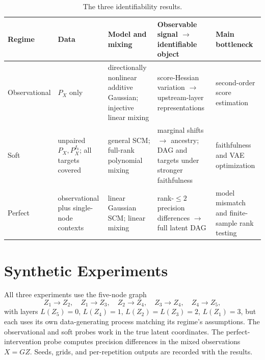 \documentclass{article}
\begin{document}
\begin{table}[t]
\centering
\caption{The three identifiability results.}
\label{tab:comparison}
\begingroup
\footnotesize
\setlength{\tabcolsep}{3pt}
\renewcommand{\arraystretch}{1.18}
\begin{tabularx}{\textwidth}{@{}l >{\raggedright\arraybackslash}p{} >{\raggedright\arraybackslash}p{} >{\raggedright\arraybackslash}X >{\raggedright\arraybackslash}p{}@{}}
\toprule
\textbf{Regime} & \textbf{Data} & \textbf{Model and mixing} & \textbf{Observable signal $\boldsymbol{\rightarrow}$ identifiable object} & \textbf{Main bottleneck} \\
\midrule
Observational & $P_X$ only & directionally nonlinear additive Gaussian; injective linear mixing & score-Hessian variation $\rightarrow$ upstream-layer representations & second-order score estimation \\
\addlinespace[0.15em]
Soft & unpaired $P_X,P_X^{I_k}$; all targets covered & general SCM; full-rank polynomial mixing & marginal shifts $\rightarrow$ ancestry; DAG and targets under stronger faithfulness & faithfulness and VAE optimization \\
\addlinespace[0.15em]
Perfect & observational plus single-node contexts & linear Gaussian SCM; linear mixing & rank-$\leq2$ precision differences $\rightarrow$ full latent DAG & model mismatch and finite-sample rank testing \\
\bottomrule
\end{tabularx}
\endgroup
\end{table}

\section{Synthetic Experiments}
\label{sec:synthetic}

All three experiments use the five-node graph
\begin{equation}
    Z_1\to Z_2,\quad Z_1\to Z_3,\quad
    Z_2\to Z_4,\quad Z_3\to Z_4,\quad Z_4\to Z_5,
    \label{eq:shared-dag}
\end{equation}
with layers $L(Z_5)=0$, $L(Z_4)=1$, $L(Z_2)=L(Z_3)=2$, $L(Z_1)=3$, but each uses its own data-generating process matching its regime's assumptions. The observational and soft probes work in the true latent coordinates. The perfect-intervention probe computes precision differences in the mixed observations $X=GZ$. Seeds, grids, and per-repetition outputs are recorded with the results.
\end{document}
